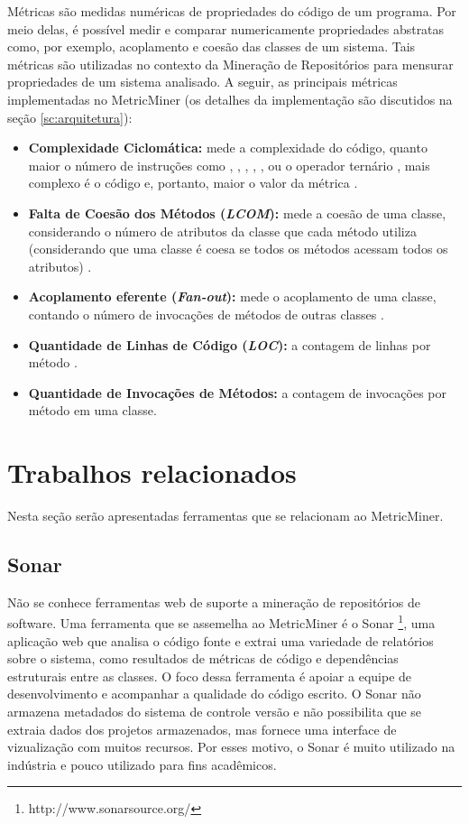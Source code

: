 \documentclass[a4paper, 12pt, twoside]{book}
\newcommand{\codechunk}[1]{{\ttfamily {\small #1}}}
\begin{document}
    Métricas são medidas numéricas de propriedades do código de um programa. Por meio delas, é possível medir e comparar numericamente propriedades abstratas como, por exemplo, acoplamento e coesão das classes de um sistema. Tais métricas são utilizadas no contexto da Mineração de Repositórios para mensurar propriedades de um sistema analisado. A seguir, as principais métricas implementadas no MetricMiner (os detalhes da implementação são discutidos na seção \ref{sc:arquitetura}):

    \begin{itemize} 
        \item \textbf{Complexidade Ciclomática:} mede a complexidade do código, quanto maior o número de instruções como \codechunk{if}, \codechunk{while}, \codechunk{case}, \codechunk{\&\&}, \codechunk{||}, ou o operador ternário \codechunk{?}, mais complexo é o código e, portanto, maior o valor da métrica \cite{maccabe:76}.
        \item \textbf{Falta de Coesão dos Métodos (\textit{LCOM}):} mede a coesão de uma classe, considerando o número de atributos da classe que cada método utiliza (considerando que uma classe é coesa se todos os métodos acessam todos os atributos) \cite{henderson:96}.
        \item \textbf{Acoplamento eferente (\textit{Fan-out}):} mede o acoplamento de uma classe, contando o número de invocações de métodos de outras classes \cite{lorenz:94}.
        \item \textbf{Quantidade de Linhas de Código (\textit{LOC}):} a contagem de linhas por método \cite{chidamber:94}.
        \item \textbf{Quantidade de Invocações de Métodos:} a contagem de invocações por método \cite{li:93} em uma classe.
    \end{itemize}

\chapter{Trabalhos relacionados} \label{ch:trabalhos}

Nesta seção serão apresentadas ferramentas que se relacionam ao MetricMiner.

\section*{Sonar}
    Não se conhece ferramentas web de suporte a mineração de repositórios de software. Uma ferramenta que se assemelha ao MetricMiner é o Sonar \footnote{http://www.sonarsource.org/}, uma aplicação web que analisa o código fonte e extrai uma variedade de relatórios sobre o sistema, como resultados de métricas de código e dependências estruturais entre as classes. O foco dessa ferramenta é apoiar a equipe de desenvolvimento e acompanhar a qualidade do código escrito. O Sonar não armazena metadados do sistema de controle versão e não possibilita que se extraia dados dos projetos armazenados, mas fornece uma interface de vizualização com muitos recursos. Por esses motivo, o Sonar é muito utilizado na indústria e pouco utilizado para fins acadêmicos.
    
\end{document}
